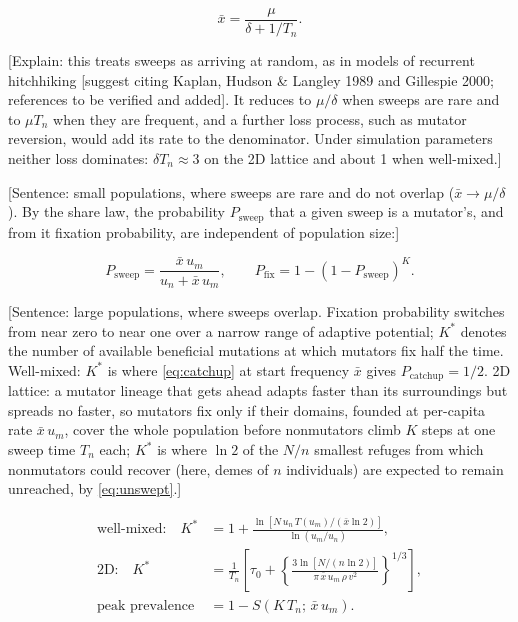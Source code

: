 \begin{equation}
  \bar{x} = \frac{\mu}{\delta + 1 / T_n}. \label{eq:xbar}
\end{equation}

[Explain: this treats sweeps as arriving at random, as in models of recurrent hitchhiking [suggest citing Kaplan, Hudson \& Langley 1989 and Gillespie 2000; references to be verified and added]. It reduces to $\mu / \delta$ when sweeps are rare and to $\mu T_n$ when they are frequent, and a further loss process, such as mutator reversion, would add its rate to the denominator. Under simulation parameters neither loss dominates: $\delta T_n \approx 3$ on the 2D lattice and about 1 when well-mixed.]

[Sentence: small populations, where sweeps are rare and do not overlap ($\bar{x} \to \mu / \delta$). By the share law, the probability $P_\mathrm{sweep}$ that a given sweep is a mutator's, and from it fixation probability, are independent of population size:]

\begin{equation}
  P_\mathrm{sweep} = \frac{\bar{x}\, u_m}{u_n + \bar{x}\, u_m},
  \qquad
  P_\mathrm{fix} = 1 - (1 - P_\mathrm{sweep})^K. \label{eq:denovo-small}
\end{equation}

[Sentence: large populations, where sweeps overlap. Fixation probability switches from near zero to near one over a narrow range of adaptive potential; $K^*$ denotes the number of available beneficial mutations at which mutators fix half the time.
Well-mixed: $K^*$ is where \cref{eq:catchup} at start frequency $\bar{x}$ gives $P_\mathrm{catchup} = 1/2$.
2D lattice: a mutator lineage that gets ahead adapts faster than its surroundings but spreads no faster, so mutators fix only if their domains, founded at per-capita rate $\bar{x}\, u_m$, cover the whole population before nonmutators climb $K$ steps at one sweep time $T_n$ each; $K^*$ is where $\ln 2$ of the $N / n$ smallest refuges from which nonmutators could recover (here, demes of $n$ individuals) are expected to remain unreached, by \cref{eq:unswept}.]

\begin{align}
  \text{well-mixed:} \quad K^* &= 1 + \frac{\ln\!\left[N\, u_n\, T(u_m) / (\bar{x} \ln 2)\right]}{\ln(u_m / u_n)}, \label{eq:kstar-mixed} \\
  \text{2D:} \quad K^* &= \frac{1}{T_n} \left[\tau_0 + \left\{\frac{3 \ln\!\left[N / (n \ln 2)\right]}{\pi\, \bar{x}\, u_m\, \rho\, v^2}\right\}^{1/3}\right], \label{eq:kstar-2d} \\
  \text{peak prevalence} &= 1 - S\!\left(K\, T_n;\, \bar{x}\, u_m\right). \label{eq:peak-prevalence}
\end{align}

